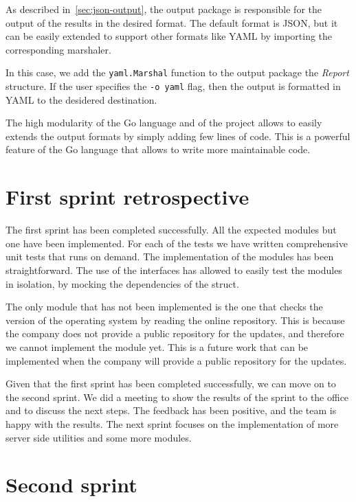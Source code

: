 As described in~\cref{sec:json-output}, the output package is responsible for the output of the results in the desired format. The default format is JSON, but it can be easily extended to support other formats like YAML by importing the corresponding marshaler.

In this case, we add the \texttt{yaml.Marshal} function to the output package the \textit{Report} structure. If the user specifies the \texttt{-o yaml} flag, then the output is formatted in YAML to the desidered destination.

The high modularity of the Go language and of the project allows to easily extends the output formats by simply adding few lines of code. This is a powerful feature of the Go language that allows to write more maintainable code.

\section{First sprint retrospective}

The first sprint has been completed successfully. All the expected modules but one have been implemented. For each of the tests we have written comprehensive unit tests that runs on demand. The implementation of the modules has been straightforward. The use of the interfaces has allowed to easily test the modules in isolation, by mocking the dependencies of the struct.

The only module that has not been implemented is the one that checks the version of the operating system by reading the online repository. This is because the company does not provide a public repository for the updates, and therefore we cannot implement the module yet. This is a future work that can be implemented when the company will provide a public repository for the updates.


Given that the first sprint has been completed successfully, we can move on to the second sprint. We did a meeting to show the results of the sprint to the office and to discuss the next steps. The feedback has been positive, and the team is happy with the results. The next sprint focuses on the implementation of more server side utilities and some more modules.

\section{Second sprint}

